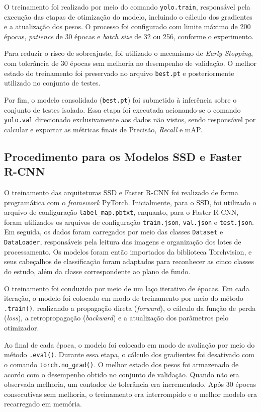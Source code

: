 O treinamento foi realizado por meio do comando \texttt{yolo.train}, responsável pela
execução das etapas de otimização do modelo, incluindo o cálculo dos gradientes e a
atualização dos pesos. O processo foi configurado com limite máximo de 200 épocas,
\textit{patience} de 30 épocas e \textit{batch size} de 32 ou 256, conforme o experimento.

\vspace{1em}
Para reduzir o risco de sobreajuste, foi utilizado o mecanismo de \textit{Early Stopping},
com tolerância de 30 épocas sem melhoria no desempenho de validação. O melhor estado do
treinamento foi preservado no arquivo \texttt{best.pt} e posteriormente utilizado no
conjunto de testes.

Por fim, o modelo consolidado (\texttt{best.pt}) foi submetido à inferência sobre o conjunto de testes
isolado. Essa etapa foi executada acionando-se o comando \texttt{yolo.val} direcionado
exclusivamente aos dados não vistos, sendo responsável por calcular e exportar as métricas
finais de Precisão, \textit{Recall} e mAP.

\subsection{Procedimento para os Modelos SSD e Faster R-CNN}
O treinamento das arquiteturas SSD e Faster R-CNN foi realizado de forma programática com o
\textit{framework} PyTorch. Inicialmente, para o SSD, foi utilizado o arquivo de configuração
\texttt{label\_map.pbtxt}, enquanto, para o Faster R-CNN, foram utilizados os arquivos de
configuração \texttt{train.json}, \texttt{val.json} e \texttt{test.json}. Em seguida, os
dados foram carregados por meio das classes \texttt{Dataset} e \texttt{DataLoader},
responsáveis pela leitura das imagens e organização dos lotes de processamento. Os modelos
foram então importados da biblioteca Torchvision, e seus cabeçalhos de classificação foram
adaptados para reconhecer as cinco classes do estudo, além da classe correspondente ao plano
de fundo.

O treinamento foi conduzido por meio de um laço iterativo de épocas. Em cada iteração, o
modelo foi colocado em modo de treinamento por meio do método \texttt{.train()}, realizando a
propagação direta (\textit{forward}), o cálculo da função de perda (\textit{loss}), a
retropropagação (\textit{backward}) e a atualização dos parâmetros pelo otimizador.

Ao final de cada época, o modelo foi colocado em modo de avaliação por meio do método
\texttt{.eval()}. Durante essa etapa, o cálculo dos gradientes foi desativado com o comando
\texttt{torch.no\_grad()}. O melhor estado dos pesos foi armazenado de acordo com o desempenho
obtido no conjunto de validação. Quando não era observada melhoria, um contador de tolerância
era incrementado. Após 30 épocas consecutivas sem melhoria, o treinamento era interrompido e
o melhor modelo era recarregado em memória.

